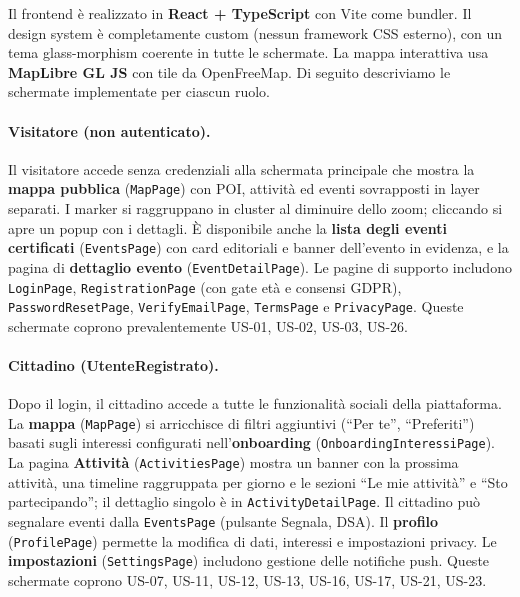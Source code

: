 \documentclass[11pt,a4paper]{article}
\newcommand{\code}[1]{\texttt{\small#1}}
\begin{document}
  Il frontend \`{e} realizzato in \textbf{React + TypeScript} con Vite come bundler.
  Il design system \`{e} completamente custom (nessun framework CSS esterno), con un tema
  glass-morphism coerente in tutte le schermate. La mappa interattiva usa \textbf{MapLibre GL JS}
  con tile da OpenFreeMap. Di seguito descriviamo le schermate implementate per ciascun ruolo.

  \paragraph{Visitatore (non autenticato).}
  Il visitatore accede senza credenziali alla schermata principale che mostra la
  \textbf{mappa pubblica} (\code{MapPage}) con POI, attivit\`{a} ed eventi sovrapposti in
  layer separati. I marker si raggruppano in cluster al diminuire dello zoom; cliccando
  si apre un popup con i dettagli. \`{E} disponibile anche la \textbf{lista degli eventi
  certificati} (\code{EventsPage}) con card editoriali e banner dell'evento in evidenza,
  e la pagina di \textbf{dettaglio evento} (\code{EventDetailPage}). Le pagine di supporto
  includono \code{LoginPage}, \code{RegistrationPage} (con gate et\`{a} e consensi GDPR),
  \code{PasswordResetPage}, \code{VerifyEmailPage}, \code{TermsPage} e \code{PrivacyPage}.
  Queste schermate coprono prevalentemente US-01, US-02, US-03, US-26.

  \paragraph{Cittadino (UtenteRegistrato).}
  Dopo il login, il cittadino accede a tutte le funzionalit\`{a} sociali della piattaforma.
  La \textbf{mappa} (\code{MapPage}) si arricchisce di filtri aggiuntivi (``Per te'',
  ``Preferiti'') basati sugli interessi configurati nell'\textbf{onboarding}
  (\code{OnboardingInteressiPage}). La pagina \textbf{Attivit\`{a}} (\code{ActivitiesPage})
  mostra un banner con la prossima attivit\`{a}, una timeline raggruppata per giorno e le
  sezioni ``Le mie attivit\`{a}'' e ``Sto partecipando''; il dettaglio singolo
  \`{e} in \code{ActivityDetailPage}. Il cittadino pu\`{o} segnalare eventi dalla
  \code{EventsPage} (pulsante Segnala, DSA). Il \textbf{profilo} (\code{ProfilePage})
  permette la modifica di dati, interessi e impostazioni privacy. Le \textbf{impostazioni}
  (\code{SettingsPage}) includono gestione delle notifiche push. Queste schermate coprono
  US-07, US-11, US-12, US-13, US-16, US-17, US-21, US-23.
\end{document}
